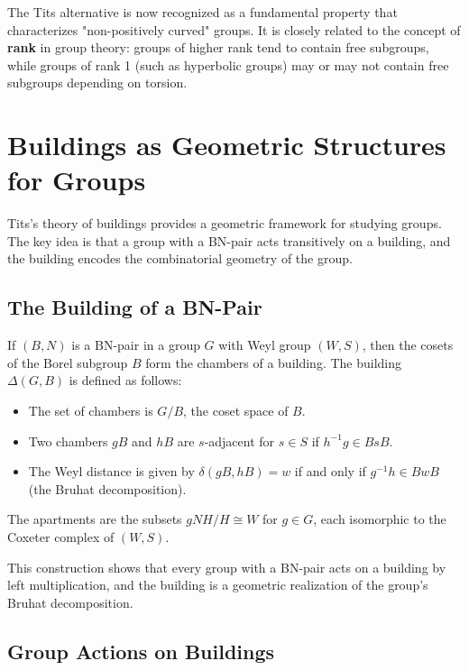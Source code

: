 The Tits alternative is now recognized as a fundamental property that characterizes "non-positively curved" groups. It is closely related to the concept of \textbf{rank} in group theory: groups of higher rank tend to contain free subgroups, while groups of rank 1 (such as hyperbolic groups) may or may not contain free subgroups depending on torsion.

\section{Buildings as Geometric Structures for Groups}

Tits's theory of buildings provides a geometric framework for studying groups. The key idea is that a group with a BN-pair acts transitively on a building, and the building encodes the combinatorial geometry of the group.

\subsection{The Building of a BN-Pair}

If \((B, N)\) is a BN-pair in a group \(G\) with Weyl group \((W, S)\), then the cosets of the Borel subgroup \(B\) form the chambers of a building. The building \(\Delta(G, B)\) is defined as follows:
\begin{itemize}
    \item The set of chambers is \(G/B\), the coset space of \(B\).
    \item Two chambers \(gB\) and \(hB\) are \(s\)-adjacent for \(s \in S\) if \(h^{-1}g \in B s B\).
    \item The Weyl distance is given by \(\delta(gB, hB) = w\) if and only if \(g^{-1}h \in B w B\) (the Bruhat decomposition).
\end{itemize}
The apartments are the subsets \(g N H / H \cong W\) for \(g \in G\), each isomorphic to the Coxeter complex of \((W, S)\).

This construction shows that every group with a BN-pair acts on a building by left multiplication, and the building is a geometric realization of the group's Bruhat decomposition.

\subsection{Group Actions on Buildings}

